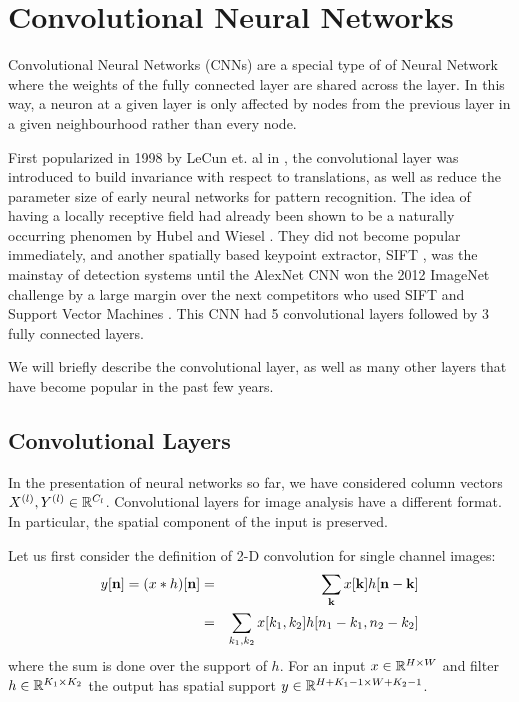 \section{Convolutional Neural Networks}
Convolutional Neural Networks (CNNs) are a special type of of Neural Network where the
weights of the fully connected layer are shared across the layer. 
In this way, a neuron at a given layer is only affected by
nodes from the previous layer in a given neighbourhood rather than every node.

First popularized in 1998 by LeCun et. al in \cite{lecun_gradient-based_1998},
the convolutional layer was introduced to build invariance with respect to
translations, as well as reduce the parameter size of early neural networks for
pattern recognition. The idea of having a locally receptive field had already
been shown to be a naturally occurring phenomen by Hubel and Wiesel
\cite{hubel_receptive_1962}. They did not become popular immediately, and
another spatially based keypoint extractor, SIFT \cite{lowe_distinctive_2004},
was the mainstay of detection systems until the AlexNet CNN
\cite{krizhevsky_imagenet_2012} won the 2012 ImageNet challenge
\cite{russakovsky_imagenet_2014} by a large margin over the next competitors who
used SIFT and Support Vector Machines \cite{cortes_support-vector_1995}. This
CNN had 5 convolutional layers followed by 3 fully connected layers.

We will briefly describe the convolutional layer, as well as many other layers
that have become popular in the past few years.

\subsection{Convolutional Layers}
In the presentation of neural networks so far, we have considered column vectors 
$X^{(l)},Y^{(l)} \in \reals[C_{l}]$. Convolutional layers for image analysis
have a different format. In particular, the spatial component of the input is
preserved. 

Let us first consider the definition of 2-D convolution for single channel
images:
\begin{eqnarray}
  y[\nn] = (x\conv h)[\nn] &=& \sum_{\mathbf{k}} x[\mathbf{k}]h[\nn-\mathbf{k}] \label{eq:ch2:conv1}\\
                      &=& \sum_{k_1, k_2} x[k_1,k_2]h[n_1-k_1, n_2-k_2]
\end{eqnarray}
where the sum is done over the support of $h$. For an input $x\in \reals[H\x W]$
and filter $h\in \reals[K_1\x K_2]$ the output has spatial support $y\in
\reals[H+K_1-1 \x W+K_2-1]$. 


